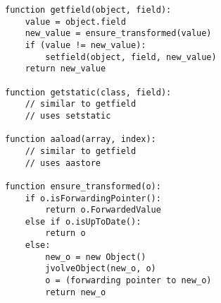 \begin{lstlisting}[frame=single]
function getfield(object, field):
    value = object.field
    new_value = ensure_transformed(value)
    if (value != new_value):
        setfield(object, field, new_value)
    return new_value

function getstatic(class, field):
    // similar to getfield
    // uses setstatic

function aaload(array, index):
    // similar to getfield
    // uses aastore

function ensure_transformed(o):
    if o.isForwardingPointer():
        return o.ForwardedValue
    else if o.isUpToDate():
        return o
    else:
        new_o = new Object()
        jvolveObject(new_o, o)
        o = (forwarding pointer to new_o)
        return new_o
\end{lstlisting}
